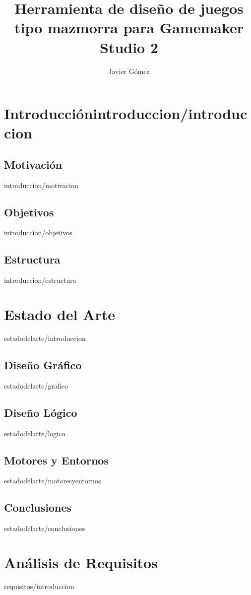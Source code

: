 \documentclass[epsbased,copyright,final,printable,covers,extendedindex,firstnumbered,tfg,gnuplot]{tfgtfmthesisuam}
\title{Herramienta de diseño de juegos tipo mazmorra para Gamemaker Studio 2}
\subtitle{}
\author{Javier Gómez}
\begin{document}
\show\newdefinition

\chapter{Introducción\label{CAP:INTRODUCCION}{introduccion/introduccion}}
	\section{Motivación\label{SEC:MOTIVACION}}{introduccion/motivacion}
	\section{Objetivos\label{SEC:OBJETIVOS}}{introduccion/objetivos}
	\section{Estructura\label{SEC:ESTRUCTURA}}{introduccion/estructura}
	
\chapter{Estado del Arte\label{CAP:ESTADODELARTE}}{estadodelarte/introduccion}
	\section{Diseño Gráfico\label{SEC:DISENOGRAFICO}}{estadodelarte/grafico}
	\section{Diseño Lógico\label{SEC:DISENOLOGICO}}{estadodelarte/logico}
	\section{Motores y Entornos\label{SEC:MOTORESYENTORNOS}}{estadodelarte/motoresyentornos}
	\section{Conclusiones\label{SEC:ESTADODELARTECONCLUSIONES}}{estadodelarte/conclusiones}
	
\chapter{Análisis de Requisitos\label{CAP:REQUISITOS}}{requisitos/introduccion}
\end{document}
